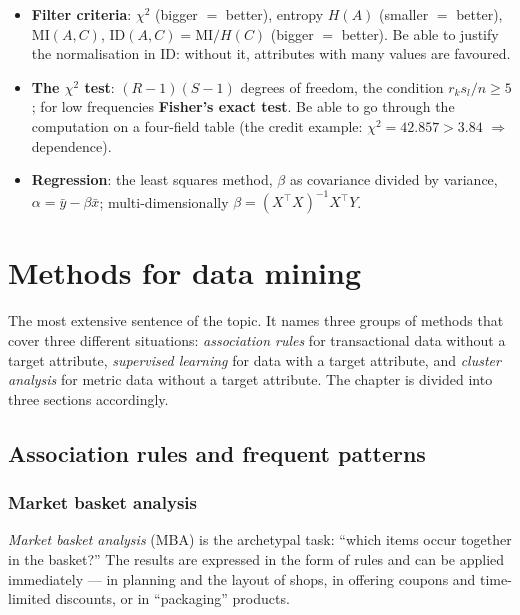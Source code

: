 \documentclass[11pt,a4paper]{article}
\theoremstyle{definition}
\providecommand{\uv}[1]{``#1''}
\begin{document}
\begin{itemize}
      Search \emph{bottom-up} (adding) or \emph{top-down} (removing).
\item \textbf{Filter criteria}: $\chi^2$ (bigger $=$ better), entropy $H(A)$ (smaller $=$
      better), $\mathrm{MI}(A,C)$, $\mathrm{ID}(A,C)=\mathrm{MI}/H(C)$ (bigger $=$ better). Be
      able to justify the normalisation in $\mathrm{ID}$: without it, attributes with many
      values are favoured.
\item \textbf{The $\chi^2$ test}: $(R-1)(S-1)$ degrees of freedom, the condition
      $r_ks_l/n\ge 5$; for low frequencies \textbf{Fisher's exact test}. Be able to go through
      the computation on a four-field table (the credit example: $\chi^2=42.857>3.84$
      $\Rightarrow$ dependence).
\item \textbf{Regression}: the least squares method, $\beta$ as covariance
      divided by variance, $\alpha=\bar y-\beta\bar x$; multi-dimensionally
      $\beta=(X^{\!\top}\!X)^{-1}X^{\!\top}Y$.
\end{itemize}

\newpage
\section{Methods for data mining}
\label{sec:metody}

The most extensive sentence of the topic. It names three groups of methods that cover three
different situations: \emph{association rules} for transactional data without a target attribute,
\emph{supervised learning} for data with a target attribute, and \emph{cluster analysis} for
metric data without a target attribute. The chapter is divided into three sections accordingly.

\subsection{Association rules and frequent patterns}
\label{ssec:ar}

\subsubsection{Market basket analysis}

\emph{Market basket analysis} (MBA) is the archetypal task: \uv{which items occur together in the
basket?} The results are expressed in the form of rules and can be applied immediately --- in
planning and the layout of shops, in offering coupons and time-limited discounts, or in
\uv{packaging} products.
\end{document}

